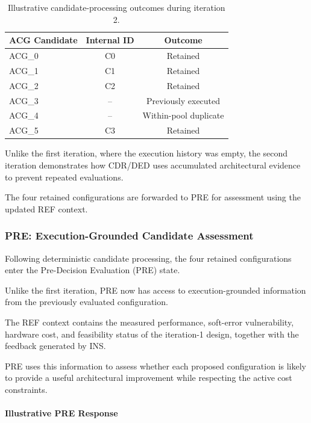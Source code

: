 \begin{table}[htbp]
\centering
\caption{Illustrative candidate-processing
outcomes during iteration 2.}
\label{tab:illustrative_cdr2_mapping}
\renewcommand{\arraystretch}{1.1}
\begin{tabular}{lcc}
\hline
\textbf{ACG Candidate} &
\textbf{Internal ID} &
\textbf{Outcome} \\
\hline
ACG\_0 & C0 & Retained \\
ACG\_1 & C1 & Retained \\
ACG\_2 & C2 & Retained \\
ACG\_3 & -- & Previously executed \\
ACG\_4 & -- & Within-pool duplicate \\
ACG\_5 & C3 & Retained \\
\hline
\end{tabular}
\end{table}

Unlike the first iteration, where the
execution history was empty, the
second iteration demonstrates how
CDR/DED uses accumulated architectural
evidence to prevent repeated evaluations.

The four retained configurations are
forwarded to PRE for assessment using
the updated REF context.



\subsubsection{PRE: Execution-Grounded Candidate Assessment}
\label{app:illustrative_pre2}

Following deterministic candidate processing,
the four retained configurations enter the
Pre-Decision Evaluation (PRE) state.

Unlike the first iteration, PRE now has access
to execution-grounded information from the
previously evaluated configuration.

The REF context contains the measured
performance, soft-error vulnerability,
hardware cost, and feasibility status
of the iteration-1 design, together with
the feedback generated by INS.

PRE uses this information to assess whether
each proposed configuration is likely to
provide a useful architectural improvement
while respecting the active cost constraints.

\paragraph{Illustrative PRE Response}

